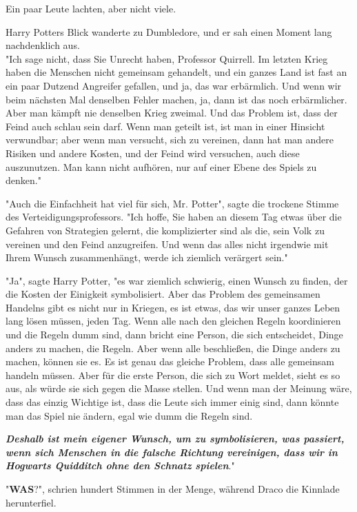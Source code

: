 {Ein paar Leute lachten, aber nicht viele.

Harry Potters Blick wanderte zu Dumbledore, und er sah einen Moment lang nachdenklich aus.\\ "Ich sage nicht, dass Sie Unrecht haben, Professor Quirrell. Im letzten Krieg haben die Menschen nicht gemeinsam gehandelt, und ein ganzes Land ist fast an ein paar Dutzend Angreifer gefallen, und ja, das war erbärmlich. Und wenn wir beim nächsten Mal denselben Fehler machen, ja, dann ist das noch erbärmlicher. Aber man kämpft nie denselben Krieg zweimal. Und das Problem ist, dass der Feind auch schlau sein darf. Wenn man geteilt ist, ist man in einer Hinsicht verwundbar; aber wenn man versucht, sich zu vereinen, dann hat man andere Risiken und andere Kosten, und der Feind wird versuchen, auch diese auszunutzen. Man kann nicht aufhören, nur auf einer Ebene des Spiels zu denken."

"Auch die Einfachheit hat viel für sich, Mr. Potter", sagte die trockene Stimme des Verteidigungsprofessors. "Ich hoffe, Sie haben an diesem Tag etwas über die Gefahren von Strategien gelernt, die komplizierter sind als die, sein Volk zu vereinen und den Feind anzugreifen. Und wenn das alles nicht irgendwie mit Ihrem Wunsch zusammenhängt, werde ich ziemlich verärgert sein."

"Ja", sagte Harry Potter, "es war ziemlich schwierig, einen Wunsch zu finden, der die Kosten der Einigkeit symbolisiert. Aber das Problem des gemeinsamen Handelns gibt es nicht nur in Kriegen, es ist etwas, das wir unser ganzes Leben lang lösen müssen, jeden Tag. Wenn alle nach den gleichen Regeln koordinieren und die Regeln dumm sind, dann bricht eine Person, die sich entscheidet, Dinge anders zu machen, die Regeln. Aber wenn alle beschließen, die Dinge anders zu machen, können sie es. Es ist genau das gleiche Problem, dass alle gemeinsam handeln müssen. Aber für die erste Person, die sich zu Wort meldet, sieht es so aus, als würde sie sich gegen die Masse stellen. Und wenn man der Meinung wäre, dass das einzig Wichtige ist, dass die Leute sich immer einig sind, dann könnte man das Spiel nie ändern, egal wie dumm die Regeln sind.

\textbf{\emph{Deshalb ist mein eigener Wunsch, um zu symbolisieren, was passiert, wenn sich Menschen in die falsche Richtung vereinigen, dass wir in Hogwarts Quidditch ohne den Schnatz spielen}}."

"\textbf{WAS}?", schrien hundert Stimmen in der Menge, während Draco die Kinnlade herunterfiel.

}
